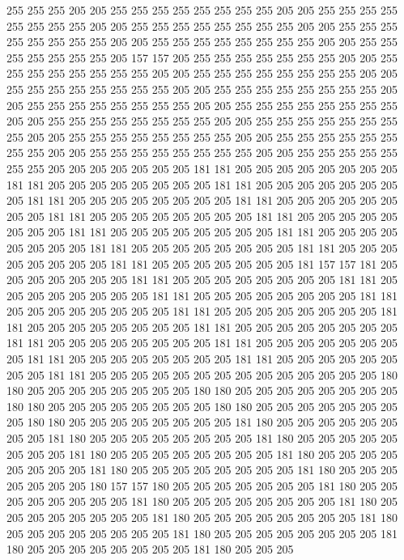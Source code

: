 255 255 255 205 205 255 255 255 255 255 255 255 255 205 205 255 255 255 255 255
255 255 255 205 205 255 255 255 255 255 255 255 255 205 205 255 255 255 255 255
255 255 255 205 205 255 255 255 255 255 255 255 255 205 205 255 255 255 255 255
255 255 205 157 157 205 255 255 255 255 255 255 255 205 205 255 255 255 255 255
255 255 255 205 205 255 255 255 255 255 255 255 255 205 205 255 255 255 255 255
255 255 255 205 205 255 255 255 255 255 255 255 255 205 205 255 255 255 255 255
255 255 255 205 205 255 255 255 255 255 255 255 255 205 205 255 255 255 255 255
255 255 255 205 205 255 255 255 255 255 255 255 255 205 205 255 255 255 255 255
255 255 255 205 205 255 255 255 255 255 255 255 255 205 205 255 255 255 255 255
255 255 255 205 205 255 255 255 255 255 255 255 205 205 205 205 205 205 205 181
181 205 205 205 205 205 205 205 205 181 181 205 205 205 205 205 205 205 205 181
181 205 205 205 205 205 205 205 205 181 181 205 205 205 205 205 205 205 205 181
181 205 205 205 205 205 205 205 205 181 181 205 205 205 205 205 205 205 205 181
181 205 205 205 205 205 205 205 205 181 181 205 205 205 205 205 205 205 205 181
181 205 205 205 205 205 205 205 205 181 181 205 205 205 205 205 205 205 205 181
181 205 205 205 205 205 205 205 205 181 181 205 205 205 205 205 205 205 181 157
157 181 205 205 205 205 205 205 205 181 181 205 205 205 205 205 205 205 205 181
181 205 205 205 205 205 205 205 205 181 181 205 205 205 205 205 205 205 205 181
181 205 205 205 205 205 205 205 205 181 181 205 205 205 205 205 205 205 205 181
181 205 205 205 205 205 205 205 205 181 181 205 205 205 205 205 205 205 205 181
181 205 205 205 205 205 205 205 205 181 181 205 205 205 205 205 205 205 205 181
181 205 205 205 205 205 205 205 205 181 181 205 205 205 205 205 205 205 205 181
181 205 205 205 205 205 205 205 205 205 205 205 205 205 205 180 180 205 205 205
205 205 205 205 205 180 180 205 205 205 205 205 205 205 205 180 180 205 205 205
205 205 205 205 205 180 180 205 205 205 205 205 205 205 205 180 180 205 205 205
205 205 205 205 205 181 180 205 205 205 205 205 205 205 205 181 180 205 205 205
205 205 205 205 205 181 180 205 205 205 205 205 205 205 205 181 180 205 205 205
205 205 205 205 205 181 180 205 205 205 205 205 205 205 205 181 180 205 205 205
205 205 205 205 205 181 180 205 205 205 205 205 205 205 180 157 157 180 205 205
205 205 205 205 205 181 180 205 205 205 205 205 205 205 205 181 180 205 205 205
205 205 205 205 205 181 180 205 205 205 205 205 205 205 205 181 180 205 205 205
205 205 205 205 205 181 180 205 205 205 205 205 205 205 205 181 180 205 205 205
205 205 205 205 205 181 180 205 205 205 205 205 205 205 205 181 180 205 205 205
